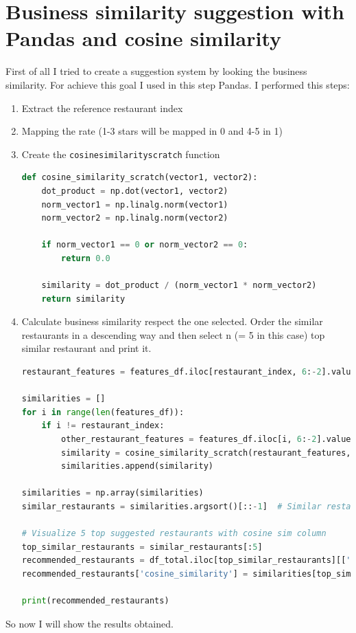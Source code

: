 \documentclass[12pt,english]{report}
\begin{document}
\section{Business similarity suggestion with Pandas and cosine similarity}\label{bussimpand}
First of all I tried to create a suggestion system by looking the business similarity. For achieve this goal I used in this step Pandas. I performed this steps:
\begin{enumerate}
\item Extract the reference restaurant index
\item Mapping the rate (1-3 stars will be mapped in 0 and 4-5 in 1)
\item Create the \texttt{cosine\textunderscore similarity\textunderscore scratch} function
\begin{lstlisting}[language={Python},escapechar=|,label={lst:cosinesim},caption={Cosine similarity function}]
def cosine_similarity_scratch(vector1, vector2):
    dot_product = np.dot(vector1, vector2)
    norm_vector1 = np.linalg.norm(vector1)
    norm_vector2 = np.linalg.norm(vector2)
    
    if norm_vector1 == 0 or norm_vector2 == 0:
        return 0.0
    
    similarity = dot_product / (norm_vector1 * norm_vector2)
    return similarity

\end{lstlisting}
\item Calculate business similarity respect the one selected. Order the similar restaurants in a descending way and then select n (= 5 in this case) top similar restaurant and print it.
\begin{lstlisting}[language={Python},escapechar=|,label={lst:simpandas},caption={Suggestion system in Pandas}]
restaurant_features = features_df.iloc[restaurant_index, 6:-2].values  # Reference restaurant feature vector

similarities = []
for i in range(len(features_df)):
    if i != restaurant_index:
        other_restaurant_features = features_df.iloc[i, 6:-2].values
        similarity = cosine_similarity_scratch(restaurant_features, other_restaurant_features)
        similarities.append(similarity)

similarities = np.array(similarities)
similar_restaurants = similarities.argsort()[::-1]  # Similar restaurant ordered in a desc way

# Visualize 5 top suggested restaurants with cosine sim column
top_similar_restaurants = similar_restaurants[:5]
recommended_restaurants = df_total.iloc[top_similar_restaurants][['name', 'stars']]
recommended_restaurants['cosine_similarity'] = similarities[top_similar_restaurants]

print(recommended_restaurants)

\end{lstlisting}
\end{enumerate}
So now I will show the results obtained.
\end{document}
